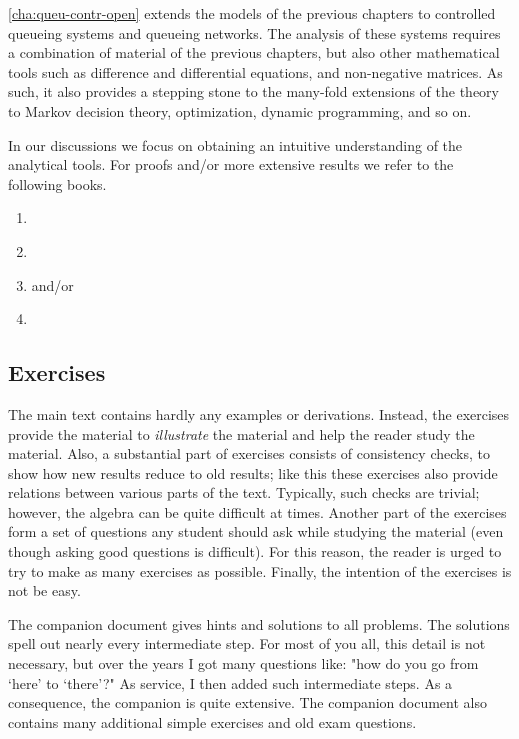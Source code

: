 \documentclass[companion]{subfiles}
\begin{document}
\cref{cha:queu-contr-open} extends the models of the previous chapters to controlled queueing systems and queueing networks.
The analysis of these systems requires a combination of material of the previous chapters, but also other mathematical tools such as difference and differential equations, and non-negative matrices.
As such, it also provides a stepping stone to the many-fold extensions of the theory to Markov decision theory, optimization, dynamic programming, and so on.

In our discussions we focus on obtaining an intuitive understanding of the analytical tools. For proofs and/or more extensive results we refer to the following books.
\begin{enumerate}
\item \citet{bolch06:_queuein_networ_markov_chain}
\item \citet{el-taha98:_sampl_path_analy_queuein_system}
\item \citet{tijms94:_stoch_model_algor_approac} and/or \citet{tijms03:_first_cours_stoch_model}
\item \citet{capinski03:_probab_probl}
\end{enumerate}



\subsection*{Exercises}

The main text contains hardly any examples or derivations.
Instead, the exercises provide the material to \emph{illustrate} the material and help the reader study the material.
Also, a substantial part of exercises consists of consistency checks, to show how new results reduce to old results; like this these exercises also provide relations between various parts of the text.
Typically, such checks are trivial; however, the algebra can be quite difficult at times.
Another part of the exercises form a set of questions any student should ask while studying the material (even though asking good questions is difficult).
For this reason, the reader is urged to try to make as many exercises as possible.
Finally, the intention of  the exercises is not be easy.

The companion document gives hints and solutions to all problems.
The solutions spell out nearly every intermediate step.
For most of you all, this detail is not necessary, but over the years I got many questions like: "how do you go from `here' to `there'?"
As service, I then added such intermediate steps.
As a consequence, the companion is quite extensive.
The companion document also contains many additional simple exercises and old exam questions.
\end{document}
